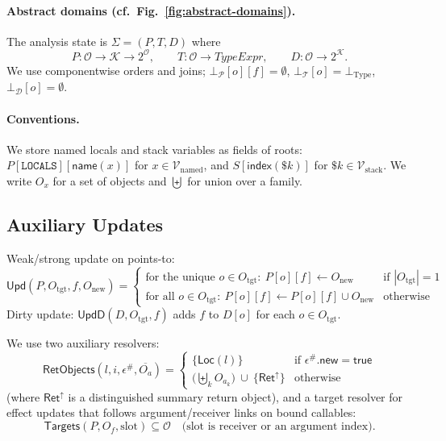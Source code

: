 \paragraph{Abstract domains (cf.\ Fig.~\ref{fig:abstract-domains}).}
The analysis state is \(\Sigma=(P,T,D)\) where
\[
P:\mathcal{O}\to\mathcal{K}\to 2^{\mathcal{O}},\qquad
T:\mathcal{O}\to \mathit{TypeExpr},\qquad
D:\mathcal{O}\to 2^{\mathcal{K}}.
\]
We use componentwise orders and joins; \(\bot_{\mathcal{P}}[o][f]=\emptyset\),
\(\bot_{\mathcal{T}}[o]=\bot_{\mathrm{Type}}\), \(\bot_{\mathcal{D}}[o]=\emptyset\).

\paragraph{Conventions.}
We store named locals and stack variables as fields of roots:
\(P[\mathtt{LOCALS}][\mathsf{name}(x)]\) for \(x\in\mathcal{V}_{\mathrm{named}}\),
and \(S[\mathsf{index}(\$k)]\) for \(\$k\in\mathcal{V}_{\mathrm{stack}}\).
We write \(O_x\) for a set of objects and \(\biguplus\) for union over a family.

\subsection{Auxiliary Updates}

Weak/strong update on points-to:
\[
\mathsf{Upd}(P,O_{\mathrm{tgt}},f,O_{\mathrm{new}})=
\begin{cases}
\text{for the unique }o\in O_{\mathrm{tgt}}:~P[o][f]\leftarrow O_{\mathrm{new}} & \text{if }|O_{\mathrm{tgt}}|=1\\
\text{for all }o\in O_{\mathrm{tgt}}:~P[o][f]\leftarrow P[o][f]\cup O_{\mathrm{new}} & \text{otherwise}
\end{cases}
\]
Dirty update: \(\mathsf{UpdD}(D,O_{\mathrm{tgt}},f)\) adds \(f\) to \(D[o]\) for each \(o\in O_{\mathrm{tgt}}\).

\smallskip
We use two auxiliary resolvers:
\[
\mathsf{RetObjects}(l,i,\epsilon^\#,\overline{O_a}) =
\begin{cases}
\{\mathsf{Loc}(l)\} & \text{if }\epsilon^\#.\mathsf{new}=\mathsf{true}\\
\Big(\biguplus_k O_{a_k}\Big)\ \cup\ \{\mathsf{Ret}^\uparrow\} & \text{otherwise}
\end{cases}
\]
(where \(\mathsf{Ret}^\uparrow\) is a distinguished summary return object),
and a target resolver for effect updates that follows argument/receiver links on bound callables:
\[
\mathsf{Targets}(P, O_f, \text{slot}) \subseteq \mathcal{O}
\quad\text{(slot is receiver or an argument index)}.
\]

